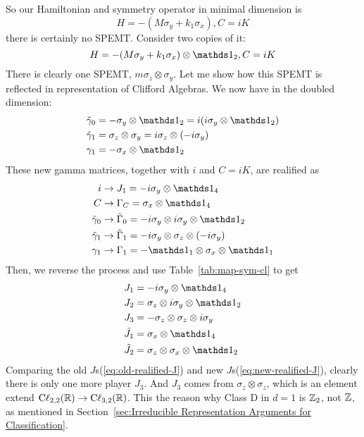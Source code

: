 So our Hamiltonian and symmetry operator in minimal dimension is
\begin{equation}
    H = -(M\sigma_y + k_1\sigma_x), C=iK
\end{equation}
there is certainly no SPEMT. Consider two copies of it:
\begin{equation}
    H = -(M\sigma_y + k_1\sigma_x)\otimes\id_2, C=iK
\end{equation}
There is clearly one SPEMT, $m\sigma_z\otimes\sigma_y$. Let me show how this
SPEMT is reflected in representation of Clifford Algebras. We now have in the
doubled dimension:
\begin{equation}
\begin{aligned}
    \tilde{\gamma}_0 &= -\sigma_y\otimes\id_2 = i(i\sigma_y\otimes\id_2) \\
    \tilde{\gamma}_1 &= \sigma_z\otimes\sigma_y = i\sigma_z\otimes(-i\sigma_y)
    \\
    \gamma_1 &= -\sigma_x\otimes\id_2
\end{aligned}
\end{equation}
These new gamma matrices, together with $i$ and $C=iK$, are realified as
\begin{equation}
\begin{aligned}
    i &\to J_1= -i\sigma_y\otimes \id_4 \\
    C &\to \Gamma_C = \sigma_x\otimes\id_4 \\
    \tilde{\gamma}_0 &\to \tilde{\Gamma}_0 = -i\sigma_y\otimes
    i\sigma_y\otimes\id_2 \\
    \tilde{\gamma}_1 &\to \tilde{\Gamma}_1 = -i\sigma_y\otimes\sigma_z\otimes
    (-i\sigma_y) \\
    \gamma_1 &\to \Gamma_1 = -\id_1\otimes\sigma_x\otimes\id_1
\end{aligned}
\end{equation}
Then, we reverse the process and use Table~\ref{tab:map-sym-cl} to get
\begin{equation}
\begin{aligned}
    \label{eq:new-realified-J}
    J_1 &= -i\sigma_y \otimes\id_4 \\
    J_2 &= \sigma_z\otimes i\sigma_y \otimes \id_2 \\
    J_3 &= -\sigma_z\otimes\sigma_z\otimes i\sigma_y \\
    \tilde{J}_1 &= \sigma_x\otimes\id_4 \\
    \tilde{J}_2 &= \sigma_z\otimes\sigma_x\otimes\id_2
\end{aligned}
\end{equation}
Comparing the old $J$s(\ref{eq:old-realified-J}) and new
$J$s(\ref{eq:new-realified-J}), clearly there is only one more player $J_3$. And
$J_3$ comes from $\sigma_z\otimes\sigma_z$, which is an element extend
$\mathrm{C\ell}_{2,2}(\mathbb{R})\to \mathrm{C\ell}_{3,2}(\mathbb{R})$. This the reason why
Class $\mathrm{D}$ in $d=1$ is $\mathbb{Z}_2$, not $\mathbb{Z}$, as mentioned in
Section~\ref{sec:Irreducible Representation Arguments for Classification}.
